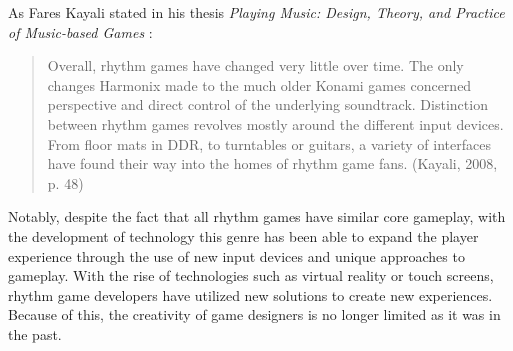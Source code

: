 As Fares Kayali stated in his thesis \textit{Playing Music: Design, Theory, and Practice of Music-based Games} \cite{faresplayingmusic}: 
\begin{quote}
    Overall, rhythm games have changed very little over time. The only changes Harmonix made to the much older Konami games concerned perspective and direct control of the underlying soundtrack. Distinction between rhythm games revolves mostly around the different input devices. From floor mats in DDR, to turntables or guitars, a variety of interfaces have found their way into the homes of rhythm game fans. (Kayali, 2008, p. 48)
\end{quote}

Notably, despite the fact that all rhythm games have similar core gameplay, with the development of technology this genre has been able to expand the player experience through the use of new input devices and unique approaches to gameplay. With the rise of technologies such as virtual reality or touch screens, rhythm game developers have utilized new solutions to create new experiences. Because of this, the creativity of game designers is no longer limited as it was in the past.